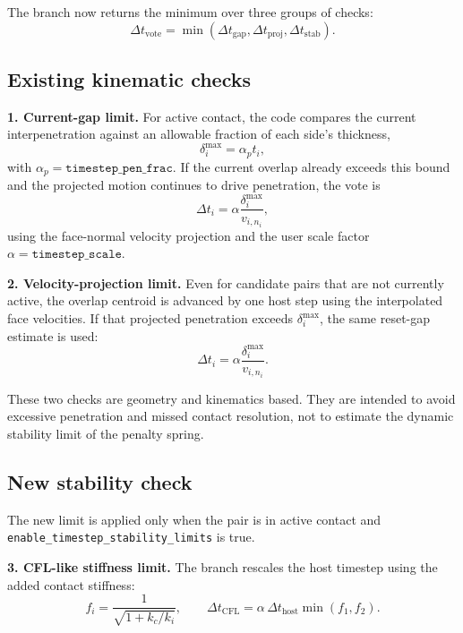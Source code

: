 \documentclass[11pt]{article}
\begin{document}
The branch now returns the minimum over three groups of checks:
\begin{equation}
  \Delta t_{\mathrm{vote}}
  = \min\!\left(
      \Delta t_{\mathrm{gap}},
      \Delta t_{\mathrm{proj}},
      \Delta t_{\mathrm{stab}}
    \right).
\end{equation}

\subsection*{Existing kinematic checks}

\textbf{1. Current-gap limit.}
For active contact, the code compares the current interpenetration against an allowable fraction of each side's thickness,
\begin{equation}
  \delta_i^{\max} = \alpha_p t_i,
\end{equation}
with $\alpha_p = \texttt{timestep\_pen\_frac}$. If the current overlap already exceeds this bound and the projected motion continues to drive penetration, the vote is
\begin{equation}
  \Delta t_i = \alpha \frac{\delta_i^{\max}}{v_{i,n_i}},
\end{equation}
using the face-normal velocity projection and the user scale factor $\alpha = \texttt{timestep\_scale}$.

\textbf{2. Velocity-projection limit.}
Even for candidate pairs that are not currently active, the overlap centroid is advanced by one host step using the interpolated face velocities. If that projected penetration exceeds $\delta_i^{\max}$, the same reset-gap estimate is used:
\begin{equation}
  \Delta t_i = \alpha \frac{\delta_i^{\max}}{v_{i,n_i}}.
\end{equation}

These two checks are geometry and kinematics based. They are intended to avoid excessive penetration and missed contact resolution, not to estimate the dynamic stability limit of the penalty spring.

\subsection*{New stability check}

The new limit is applied only when the pair is in active contact and \texttt{enable\_timestep\_stability\_limits} is true.

\textbf{3. CFL-like stiffness limit.}
The branch rescales the host timestep using the added contact stiffness:
\begin{equation}
  f_i = \frac{1}{\sqrt{1 + k_c/k_i}},
  \qquad
  \Delta t_{\mathrm{CFL}} = \alpha \, \Delta t_{\mathrm{host}} \min(f_1,f_2).
\end{equation}
\end{document}
